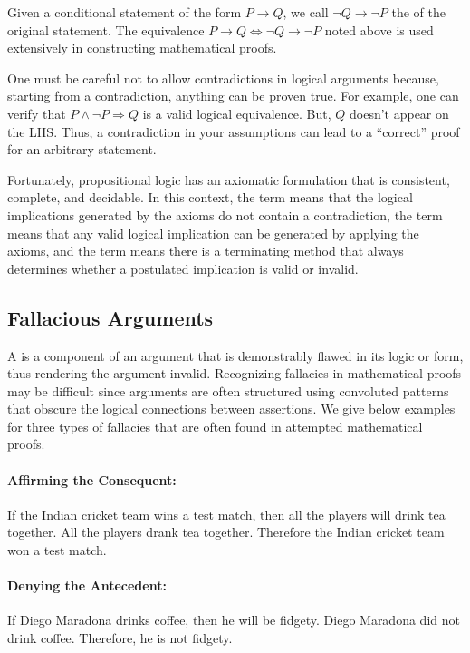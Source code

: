 Given a conditional statement of the form $P \rightarrow Q$, we call $\neg Q \rightarrow \neg P$ the  of the original statement.
The equivalence $P \rightarrow Q \Leftrightarrow \neg Q \rightarrow \neg P$ noted above is used extensively in constructing mathematical proofs.

One must be careful not to allow contradictions in logical arguments because, starting from a contradiction, anything can be proven true.
For example, one can verify that $P \wedge \neg P \Rightarrow Q$ is a valid logical equivalence.
But, $Q$ doesn't appear on the LHS.
Thus, a contradiction in your assumptions can lead to a ``correct'' proof for an arbitrary statement.

Fortunately, propositional logic has an axiomatic formulation that is consistent, complete, and decidable.
In this context, the term  means that the logical implications generated by the axioms do not contain a contradiction, the term  means that any valid logical implication can be generated by applying the axioms, and the term  means there is a terminating method that always determines whether a postulated implication is valid or invalid.

\subsection{Fallacious Arguments}

A  is a component of an argument that is demonstrably flawed in its logic or form, thus rendering the argument invalid.
Recognizing fallacies in mathematical proofs may be difficult since arguments are often structured using convoluted patterns that obscure the logical connections between assertions.
We give below examples for three types of fallacies that are often found in attempted mathematical proofs.

\paragraph{Affirming the Consequent:}
If the Indian cricket team wins a test match, then all the players will drink tea together.
All the players drank tea together.
Therefore the Indian cricket team won a test match.

\paragraph{Denying the Antecedent:}
If Diego Maradona drinks coffee, then he will be fidgety.
Diego Maradona did not drink coffee.
Therefore, he is not fidgety.

